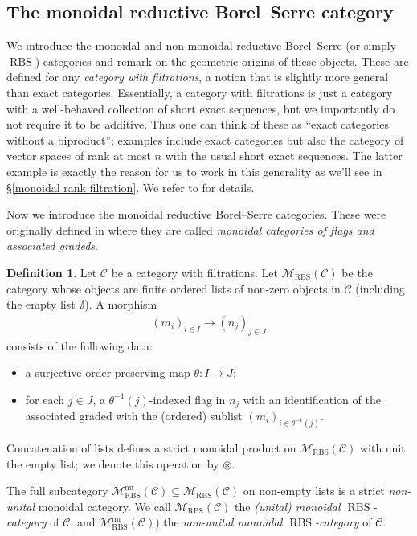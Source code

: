 \documentclass[12pt, reqno]{amsart}
\theoremstyle{plain}
\theoremstyle{definition}
\newtheorem{definition}[theorem]{Definition}
\begin{document}
\subsection{The monoidal reductive Borel--Serre category}\label{reductive borel serre categories}

We introduce the monoidal and non-monoidal reductive Borel--Serre (or simply $\operatorname{RBS}$) categories and remark on the geometric origins of these objects. These are defined for any \textit{category with filtrations}, a notion that is slightly more general than exact categories. Essentially, a category with filtrations is just a category with a well-behaved collection of short exact sequences, but we importantly do not require it to be additive. Thus one can think of these as ``exact categories without a biproduct''; examples include exact categories but also the category of vector spaces of rank at most $n$ with the usual short exact sequences. The latter example is exactly the reason for us to work in this generality as we'll see in \S \ref{monoidal rank filtration}. We refer to \cite[\S 7.1]{ClausenOrsnesJansen} for details.



Now we introduce the monoidal reductive Borel--Serre categories. These were originally defined in \cite[\S 7]{ClausenOrsnesJansen} where they are called \textit{monoidal categories of flags and associated gradeds}.

\begin{definition}\label{monoidal category of flags and associated gradeds}
Let $\mathcal{C}$ be a category with filtrations. Let $\mathscr{M}_{\operatorname{RBS}}(\mathcal{C})$ be the category whose objects are finite ordered lists of non-zero objects in $\mathcal{C}$ (including the empty list $\emptyset$). A morphism
\begin{align*}
(m_i)_{i\in I}\rightarrow (n_j)_{j\in J}
\end{align*}
consists of the following data:
\begin{itemize}
\item a surjective order preserving map $\theta\colon I\rightarrow J$;
\item for each $j\in J$, a $\theta^{-1}(j)$-indexed flag in $n_j$ with an identification of the associated graded with the (ordered) sublist $(m_i)_{i\in \theta^{-1}(j)}$.
\end{itemize}
Concatenation of lists defines a strict monoidal product on $\mathscr{M}_{\operatorname{RBS}}(\mathcal{C})$ with unit the empty list; we denote this operation by $\circledast$.

The full subcategory $\mathscr{M}_{\operatorname{RBS}}^{\operatorname{nu}}(\mathcal{C})\subseteq \mathscr{M}_{\operatorname{RBS}}(\mathcal{C})$ on non-empty lists is a strict \textit{non-unital} monoidal category. We call $\mathscr{M}_{\operatorname{RBS}}(\mathcal{C})$ the \textit{(unital) monoidal $\operatorname{RBS}$-category} of $\mathcal{C}$, and $\mathscr{M}_{\operatorname{RBS}}^{\operatorname{nu}}(\mathcal{C})$) the \textit{non-unital monoidal $\operatorname{RBS}$-category} of $\mathcal{C}$.
\end{definition}
\end{document}
